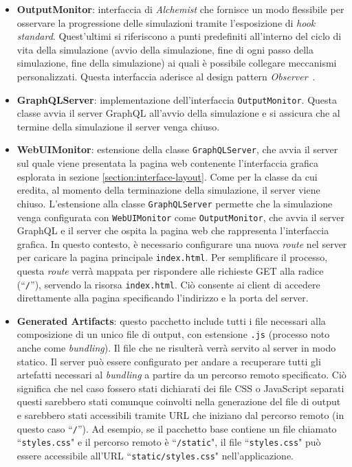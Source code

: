 \begin{itemize}
	\item \textbf{OutputMonitor}: interfaccia di \textit{Alchemist} che fornisce un modo flessibile per osservare la progressione delle simulazioni tramite l'esposizione di \textit{hook standard}.  Quest'ultimi si riferiscono a punti predefiniti all'interno del ciclo di vita della simulazione (avvio della simulazione, fine di ogni passo della simulazione, fine della simulazione) ai quali è possibile collegare meccanismi personalizzati. Questa interfaccia aderisce al design pattern \textit{Observer}~\cite{Gamma1994}.
	\item \textbf{GraphQLServer}: implementazione dell'interfaccia  \texttt{OutputMonitor}. Questa classe avvia il server GraphQL all'avvio della simulazione e si assicura che al termine della simulazione il server venga chiuso.
    \item \textbf{WebUIMonitor}: estensione della classe \texttt{GraphQLServer}, che avvia il server sul quale viene presentata la pagina web contenente l'interfaccia grafica esplorata in sezione \ref{section:interface-layout}. Come per la classe da cui eredita, al momento della terminazione della simulazione, il server viene chiuso. L'estensione alla classe \texttt{GraphQLServer} permette che la simulazione venga configurata con \texttt{WebUIMonitor} come \texttt{OutputMonitor}, che avvia il server GraphQL e il server che ospita la pagina web che rappresenta l'interfaccia grafica.
    In questo contesto, è necessario configurare una nuova \textit{route} nel server per caricare la pagina principale \texttt{index.html}. Per semplificare il processo, questa \textit{route} verrà mappata per rispondere alle richieste GET alla radice (``\texttt{/}''), servendo la risorsa \texttt{index.html}. Ciò consente ai client di accedere direttamente alla pagina specificando l'indirizzo e la porta del server.
	\item \textbf{Generated Artifacts}: questo pacchetto include tutti i file necessari alla composizione di un unico file di output, con estensione \texttt{.js} (processo noto anche come \textit{bundling}). Il file che ne risulterà verrà servito al server in modo statico. Il server può essere configurato per andare a recuperare tutti gli artefatti necessari al \textit{bundling} a partire da un percorso remoto specificato. Ciò significa che nel caso fossero stati dichiarati dei file CSS o JavaScript separati questi sarebbero stati comunque coinvolti nella generazione del file di output e sarebbero stati accessibili tramite \ac{URL} che iniziano dal percorso remoto (in questo caso ``\texttt{/}'').	
	Ad esempio, se il pacchetto base contiene un file chiamato ``\texttt{styles.css}" e il percorso remoto è ``\texttt{/static}", il file ``\texttt{styles.css}" può essere accessibile all'URL ``\texttt{static/styles.css}" nell'applicazione. 
	
\end{itemize}

